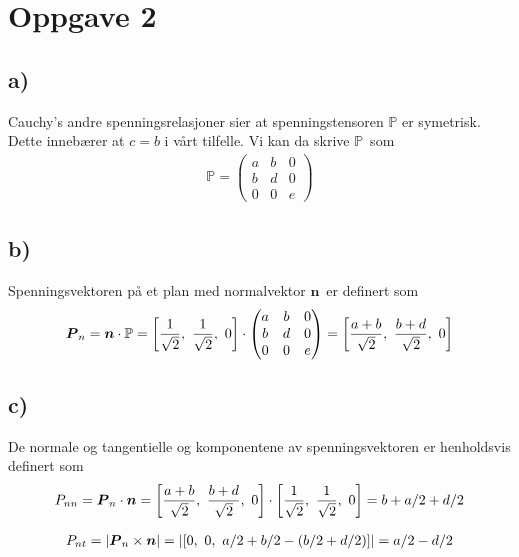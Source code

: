 \documentclass[12p,a4paper]{article}
\renewcommand{\b}{\boldsymbol}
\newcommand{\m}{\mathbb}
\begin{document}
\section*{Oppgave 2}
\subsection*{a)}
Cauchy's andre spenningsrelasjoner sier at spenningstensoren $\m P$ er symetrisk. Dette innebærer at $c = b$ i vårt tilfelle. Vi kan da skrive $\m P$ som
\begin{align*}
\m P = \begin{pmatrix} a & b & 0 \\ b & d & 0 \\ 0 & 0 & e \end{pmatrix}
\end{align*}

\subsection*{b)}
Spenningsvektoren på et plan med normalvektor $\b n$ er definert som
\begin{align*}
    \b P_n = \b n \cdot \m P = \qty[\frac{1}{\sqrt{2}},\ \frac{1}{\sqrt{2}},\ 0] \cdot \begin{pmatrix} a & b & 0 \\ b & d & 0 \\ 0 & 0 & e \end{pmatrix} = \qty[\frac{a + b}{\sqrt{2}},\ \frac{b + d}{\sqrt{2}},\ 0]
\end{align*}

\subsection*{c)}
De normale og tangentielle og komponentene av spenningsvektoren er henholdsvis definert som
\begin{align*}
    P_{nn} = \b P_n \cdot \b n = \qty[\frac{a + b}{\sqrt{2}},\ \frac{b + d}{\sqrt{2}},\ 0] \cdot \qty[\frac{1}{\sqrt{2}},\ \frac{1}{\sqrt{2}},\ 0] = b + a/2 + d/2
\end{align*}

\begin{align*}
    P_{nt} = |\b P_n \times \b n| = \qty| \qty[0,\ 0,\ a/2 + b/2 - (b/2 + d/2)] | = a/2 - d/2
\end{align*}
\end{document}
